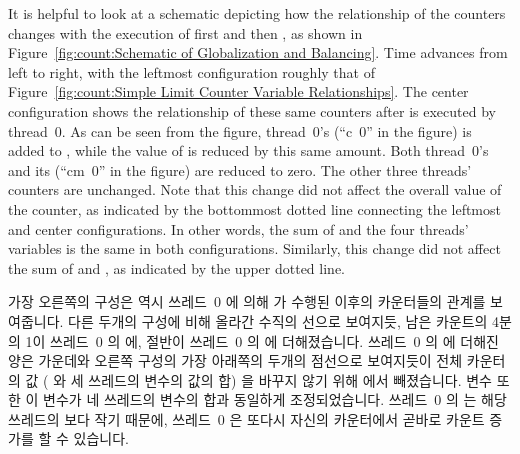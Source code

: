 It is helpful to look at a schematic depicting how the relationship
of the counters changes with the execution of first
 and then , as shown in
Figure~\ref{fig:count:Schematic of Globalization and Balancing}.
Time advances from left to right, with the leftmost configuration
roughly that of
Figure~\ref{fig:count:Simple Limit Counter Variable Relationships}.
The center configuration shows the relationship of these same counters
after  is executed by thread~0.
As can be seen from the figure, thread~0's  (``c~0'' in
the figure) is added to , while the value of
 is reduced by this same amount.
Both thread~0's  and its 
(``cm~0'' in the figure) are reduced to zero.
The other three threads' counters are unchanged.
Note that this change did not affect the overall value of the counter,
as indicated by the bottommost dotted line connecting the leftmost
and center configurations.
In other words, the sum of  and the four threads'
 variables is the same in both configurations.
Similarly, this change did not affect the sum of  and
, as indicated by the upper dotted line.
\fi

가장 오른쪽의 구성은 역시 쓰레드~0 에 의해  가 수행된
이후의 카운터들의 관계를 보여줍니다.
다른 두개의 구성에 비해 올라간 수직의 선으로 보여지듯, 남은 카운트의 4분의 1이
쓰레드~0 의  에, 절반이 쓰레드~0 의  에
더해졌습니다.
쓰레드~0 의  에 더해진 양은 가운데와 오른쪽 구성의 가장 아래쪽의
두개의 점선으로 보여지듯이 전체 카운터의 값 ( 와 세 쓰레드의
 변수의 값의 합) 을 바꾸지 않기 위해  에서
빼졌습니다.
 변수 또한 이 변수가 네 쓰레드의  변수의 합과
동일하게 조정되었습니다.
쓰레드~0 의  는 해당 쓰레드의  보다 작기 때문에,
쓰레드~0 은 또다시 자신의 카운터에서 곧바로 카운트 증가를 할 수 있습니다.

